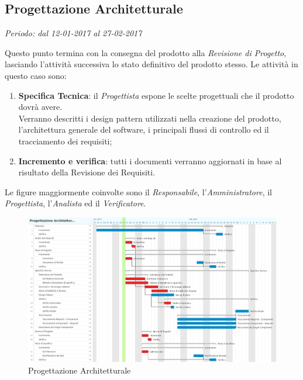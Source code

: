 \documentclass[12pt,a4paper,titlepage]{article}
\begin{document}
\subsection{Progettazione Architetturale}
\begin{center}\textit{Periodo: dal 12-01-2017 al 27-02-2017}\end{center}
Questo punto termina con la consegna del prodotto
alla \textit{Revisione di Progetto}, lasciando l'attività successiva lo stato definitivo del prodotto stesso. Le attività in questo caso sono:
\begin{enumerate}
	\item \textbf{Specifica Tecnica}: il \textit{Progettista} espone le scelte progettuali che il prodotto dovrà avere.\\
	Verranno descritti i design pattern utilizzati nella creazione del prodotto, l'architettura generale del software, i principali flussi di controllo ed il tracciamento dei requisiti;
	\item \textbf{Incremento e verifica}: tutti i documenti verranno aggiornati in base al risultato della Revisione dei Requisiti.
\end{enumerate}
Le figure maggiormente coinvolte sono il \textit{Responsabile}, l'\textit{Amministratore}, il \textit{Progettista}, l'\textit{Analista}
ed il \textit{Verificatore}. \\

\begin{figure}
	\centering
	\includegraphics[width=1\linewidth]{"Gantt Progettazione Architetturale"}
	\caption{Progettazione Architetturale}
	\label{fig:gantt-progettazione-architetturale}
\end{figure}
\end{document}
